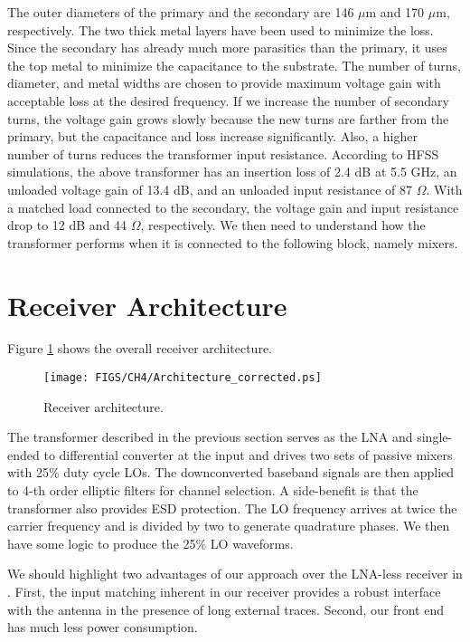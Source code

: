The outer diameters of the primary and the secondary are 146 $\mu$m and 170 $\mu$m, respectively. The two thick metal layers have been used to
minimize the loss. Since the secondary has already much more parasitics than the primary, it uses the top metal to minimize the capacitance to the
substrate. The number of turns, diameter, and metal widths are chosen to provide maximum voltage gain with acceptable loss at the desired
frequency. If we increase the number of secondary turns, the voltage gain grows slowly because the new turns are farther from the primary, but the
capacitance and loss increase significantly. Also, a higher number of turns reduces the transformer input resistance.  According to HFSS
simulations, the above transformer has an insertion loss of 2.4 dB at 5.5 GHz, an unloaded voltage gain of 13.4 dB, and an unloaded input resistance
of 87 $\Omega$. With a matched load connected to the secondary, the voltage gain and input resistance drop to 12 dB and 44 $\Omega$, respectively. We then
need to understand how the transformer performs when it is connected to the following block, namely mixers. 



\section{Receiver Architecture}
Figure \ref{fig:architecture} shows the overall receiver architecture. 
\begin{figure}[htb!]
\centering
\texttt{[image: FIGS/CH4/Architecture\_corrected.ps]}
\caption{Receiver architecture.}
\label{fig:architecture}
\end{figure}
The transformer described in the previous section serves as the LNA and single-ended to differential converter at the input and drives two sets of
passive mixers with 25\% duty cycle LOs. The downconverted baseband signals are then applied to 4-th order elliptic filters for channel selection. A
side-benefit is that the transformer also provides ESD protection. The LO frequency arrives at twice the carrier frequency and is divided by two to
generate quadrature phases. We then have some logic to produce the 25\% LO waveforms.

We should highlight two advantages of our approach over the LNA-less receiver in \cite{Nauta}. First, the input matching inherent in our receiver
provides a robust interface with the antenna in the presence of long external traces. Second, our front end has much less power consumption.

